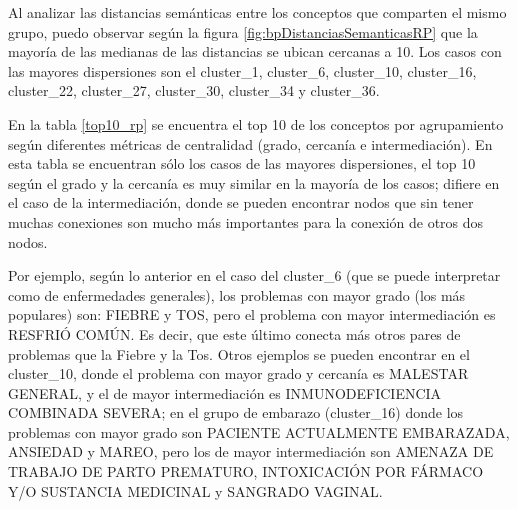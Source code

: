 Al analizar las distancias semánticas entre los conceptos que comparten el mismo grupo, puedo observar según la figura \ref{fig:bpDistanciasSemanticasRP} que la mayoría de las medianas de las distancias se ubican cercanas a 10. Los casos con las mayores dispersiones son el cluster\_1, cluster\_6, cluster\_10, cluster\_16, cluster\_22, cluster\_27, cluster\_30, cluster\_34 y cluster\_36. 

En la tabla \ref{top10_rp} se encuentra el top 10 de los conceptos por agrupamiento según diferentes métricas de centralidad (grado, cercanía e intermediación). En esta tabla se encuentran sólo los casos de las mayores dispersiones, el top 10 según el grado y la cercanía es muy similar en la mayoría de los casos; difiere en el caso de la intermediación, donde se pueden encontrar nodos que sin tener muchas conexiones son mucho más importantes para la conexión de otros dos nodos.

Por ejemplo, según lo anterior en el caso del cluster\_6 (que se puede interpretar como de enfermedades generales), los problemas con mayor grado (los más populares) son: FIEBRE y TOS, pero el problema con mayor intermediación es RESFRIÓ COMÚN. Es decir, que este último conecta más otros pares de problemas que la Fiebre y la Tos. Otros ejemplos se pueden encontrar en el cluster\_10, donde el problema con mayor grado y cercanía es MALESTAR GENERAL, y el de mayor intermediación es INMUNODEFICIENCIA COMBINADA SEVERA; en el grupo de embarazo (cluster\_16) donde los problemas con mayor grado son PACIENTE ACTUALMENTE EMBARAZADA, ANSIEDAD y MAREO, pero los de mayor intermediación son AMENAZA DE TRABAJO DE PARTO PREMATURO, INTOXICACIÓN POR FÁRMACO Y/O SUSTANCIA MEDICINAL y SANGRADO VAGINAL.

